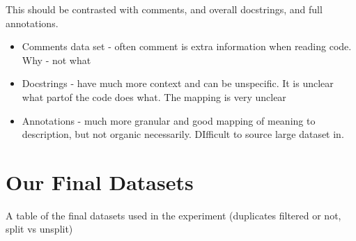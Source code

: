     This should be contrasted with comments, and overall docstrings, and full annotations.
    \begin{itemize}
        \item Comments data set - often comment is extra information when reading code. Why - not what
        \item Docstrings - have much more context and can be unspecific. It is unclear what partof the code does what. The mapping is very unclear
        \item Annotations - much more granular and good mapping of meaning to description, but not organic necessarily. DIfficult to source large dataset in.
    \end{itemize}


\section{Our Final Datasets} %
\label{sec:our_final_datasets}

A table of the final datasets used in the experiment (duplicates filtered or not, split vs unsplit)


